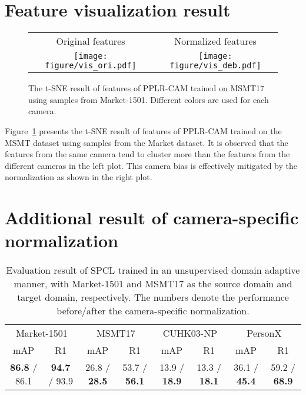 \section{Feature visualization result}

\begin{figure}[H]
  \centering
  \setlength\tabcolsep{2pt}  %
  \begin{tabular}{cc}
    \textsf{Original features} & \textsf{Normalized features} \\
    \texttt{[image: figure/vis\_ori.pdf]} &
    \texttt{[image: figure/vis\_deb.pdf]} \\
  \end{tabular}
  \vspace{-2mm}
  \caption{
    The t-SNE result of features of PPLR-CAM trained on MSMT17 using samples from Market-1501. 
    Different colors are used for each camera.
  }
  \label{fig:feat_vis}
\end{figure}

Figure~\ref{fig:feat_vis} presents the t-SNE result of features of PPLR-CAM trained on the MSMT dataset using samples from the Market dataset. 
It is observed that the features from the same camera tend to cluster more than the features from the different cameras in the left plot. 
This camera bias is effectively mitigated by the normalization as shown in the right plot.

\section{Additional result of camera-specific normalization}
\label{sup:spcl_uda}

\begin{table}[H]
    \scriptsize
    \caption{
        Evaluation result of SPCL trained in an unsupervised domain adaptive manner, with Market-1501 and MSMT17 as the source domain and target domain, respectively. 
        The numbers denote the performance before/after the camera-specific normalization.
    }
    \vspace{3pt}
    \label{tab:ice_cam}
    \centering
    {
    \renewcommand{\arraystretch}{1.2}
    \begin{tabular}{cc|cc|cc|cc}
        \hline
        \multicolumn{2}{c|}{Market-1501} & 
        \multicolumn{2}{c|}{MSMT17} & 
        \multicolumn{2}{c|}{CUHK03-NP} &
        \multicolumn{2}{c}{PersonX} \\
        
        \cline{1-8}
        mAP & R1 & mAP & R1 & mAP & R1 & mAP & R1 \\ 
        \hline \hline
        
        \textbf{86.8} / 86.1 & \textbf{94.7} / 93.9 &  26.8 / \textbf{28.5} & 53.7 / \textbf{56.1} & 13.9 / \textbf{18.9} & 13.3 / \textbf{18.1} & 36.1 / \textbf{45.4} & 59.2 / \textbf{68.9} \\
        \hline
    \end{tabular}
    }
\end{table}

